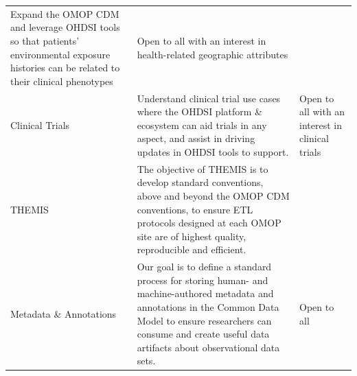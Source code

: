 \documentclass[11pt]{book}
\theoremstyle{definition}
\theoremstyle{definition}
\theoremstyle{definition}
\theoremstyle{remark}
\begin{document}
\begin{longtable}[]{@{}lll@{}}
\begin{minipage}[t]{0.25\columnwidth}
Expand the OMOP CDM and leverage OHDSI tools so that patients'
environmental exposure histories can be related to their clinical
phenotypes\strut
\end{minipage} & \begin{minipage}[t]{0.14\columnwidth}\raggedright\strut
Open to all with an interest in health-related geographic
attributes\strut
\end{minipage}\tabularnewline
\begin{minipage}[t]{0.08\columnwidth}\raggedright\strut
Clinical Trials\strut
\end{minipage} & \begin{minipage}[t]{0.25\columnwidth}\raggedright\strut
Understand clinical trial use cases where the OHDSI platform \&
ecosystem can aid trials in any aspect, and assist in driving updates in
OHDSI tools to support.\strut
\end{minipage} & \begin{minipage}[t]{0.14\columnwidth}\raggedright\strut
Open to all with an interest in clinical trials\strut
\end{minipage}\tabularnewline
\begin{minipage}[t]{0.08\columnwidth}\raggedright\strut
THEMIS\strut
\end{minipage} & \begin{minipage}[t]{0.25\columnwidth}\raggedright\strut
The objective of THEMIS is to develop standard conventions, above and
beyond the OMOP CDM conventions, to ensure ETL protocols designed at
each OMOP site are of highest quality, reproducible and efficient.\strut
\end{minipage} & \begin{minipage}[t]{0.14\columnwidth}\raggedright\strut
\strut
\end{minipage}\tabularnewline
\begin{minipage}[t]{0.08\columnwidth}\raggedright\strut
Metadata \& Annotations\strut
\end{minipage} & \begin{minipage}[t]{0.25\columnwidth}\raggedright\strut
Our goal is to define a standard process for storing human- and
machine-authored metadata and annotations in the Common Data Model to
ensure researchers can consume and create useful data artifacts about
observational data sets.\strut
\end{minipage} & \begin{minipage}[t]{0.14\columnwidth}\raggedright\strut
Open to all\strut
\end{minipage}\tabularnewline

\end{longtable}
\end{document}
